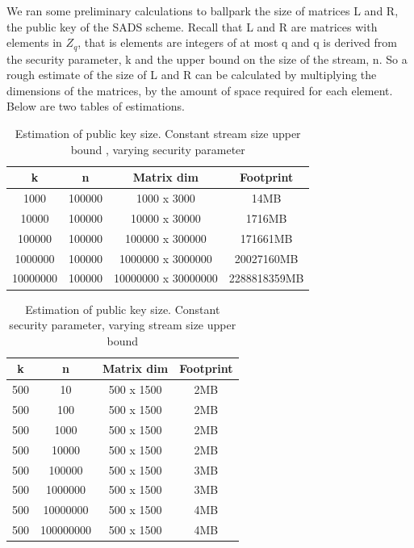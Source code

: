 \documentclass[11pt, letterpaper, oneside]{article}
\begin{document}
	We ran some preliminary calculations to ballpark the size of matrices L and R, the public key of the SADS scheme.
	Recall that L and R are matrices with elements in $Z_q$, that is elements are integers of at most q and q is derived from the security parameter, k and the upper bound on the size of the stream, n.
	So a rough estimate of the size of L and R can be calculated by multiplying the dimensions of the matrices, by the amount of space required for each element.
	Below are two tables of estimations.
	
	\begin{table}[h]
	\centering
	
		\begin{tabular} { c | c | c | c}
		
		k & n & Matrix dim & Footprint\\ \hline
		1000&100000&1000 x 3000&14MB\\
		10000&100000&10000 x 30000&1716MB\\
		100000&100000&100000 x 300000&171661MB\\
		1000000&100000&1000000 x 3000000&20027160MB\\
		10000000&100000&10000000 x 30000000&2288818359MB\\	
		\end{tabular}
	
	\caption{Estimation of public key size.  Constant stream size upper bound , varying security parameter } 
	\label{tab:pub-key_k}
	\end{table}
	
	
	\begin{table}[h]
	\centering
		\begin{tabular}{ c | c | c | c}
		k & n & Matrix dim & Footprint\\ \hline
		500&10&500 x 1500&2MB\\
		500&100&500 x 1500&2MB\\
		500&1000&500 x 1500&2MB\\
		500&10000&500 x 1500&2MB\\
		500&100000&500 x 1500&3MB\\
		500&1000000&500 x 1500&3MB\\
		500&10000000&500 x 1500&4MB\\
		500&100000000&500 x 1500&4MB\\
		
		\end{tabular}
	\caption{ Estimation of public key size.  Constant security parameter, varying stream size upper bound }
	\label{tab:pub-key_n}
	\end{table}
	
\end{document}
